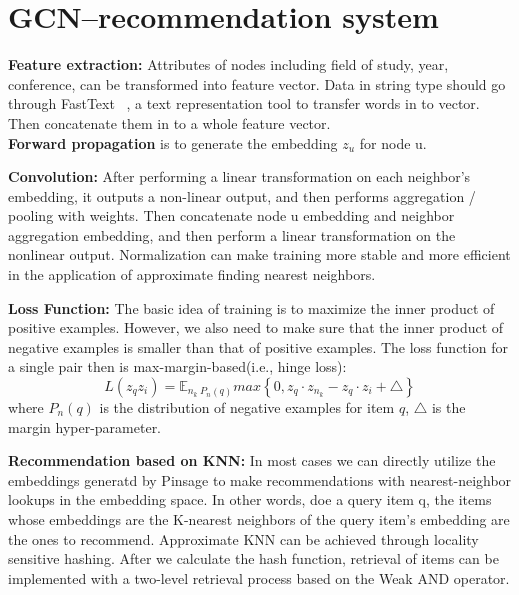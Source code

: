 \vspace{-1ex}
\section{GCN--recommendation system}
\label{sec-GCN}

\textbf{Feature extraction: }Attributes of nodes including field of study, year, conference, can be transformed into feature vector. Data in string type should go through FastText ~\cite{fasttext}, a text representation tool to transfer words in to vector. Then concatenate them in to a whole feature vector.\\
\textbf{Forward propagation} is to generate the embedding $z_u$ for node u.

\textbf{Convolution:} After performing a linear transformation on each neighbor's embedding, it outputs a non-linear output, and then performs  aggregation / pooling with weights. Then concatenate node u embedding and neighbor aggregation embedding, and then perform a linear transformation on the nonlinear output.
Normalization can make training more stable and more efficient in the application of approximate finding nearest neighbors.

\textbf{Loss Function: }
The basic idea of training is to maximize the inner product of positive examples. However, we also need to make sure that the inner product of negative examples is smaller than that of  positive examples. The loss function for a single pair then is max-margin-based(i.e., hinge loss):
$$L(z_{q}z_{i})=\mathbb{E}_{n_{k}~P_{n}(q)}max \left\{ 0,z_{q}\cdot z_{n_{k}}-z_{q}\cdot z_{i}+\triangle \right\}$$
where $P_{n}(q)$ is the distribution of negative examples for item $q$, $\triangle$ is the margin hyper-parameter.

\textbf{Recommendation based on KNN: } In most cases we can directly utilize the embeddings generatd by Pinsage to make recommendations with nearest-neighbor lookups in the embedding space. In other words, doe a query item q, the items whose embeddings are the K-nearest neighbors of the query item’s embedding are the ones to recommend. Approximate KNN can be achieved through locality sensitive hashing\cite{hashing-nn}. After we calculate the hash function, retrieval of items can be implemented with a two-level retrieval process based on the Weak AND operator\cite{twolevel}.



